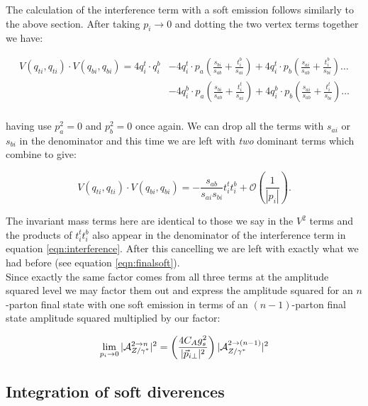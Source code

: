 			The calculation of the interference term with a soft emission follows similarly to the above section.  After taking $p_i\rightarrow0$ and dotting the two vertex terms together we have:

			\begin{equation}
			\begin{split}
			V(q_{ti}, q_{ti})\cdot V(q_{bi}, q_{bi}) = 4q_i^t\cdot q_i^b &- 4q_i^t\cdot p_a\left(\frac{s_{bi}}{s_{ab}} + \frac{t_i^b}{s_{ai}}\right) + 4q_i^t\cdot p_b\left(\frac{s_{ai}}{s_{ab}} + \frac{t_i^b}{s_{bi}}\right) \ldots\\
			&- 4q_i^b\cdot p_a\left(\frac{s_{bi}}{s_{ab}} + \frac{t_i^t}{s_{ai}}\right) + 4q_i^b\cdot p_b\left(\frac{s_{ai}}{s_{ab}} + \frac{t_i^t}{s_{bi}}\right) \ldots\\\end{split}
			\end{equation}

			having use $p_a^2=0$ and $p_b^2=0$ once again.  We can drop all the terms with $s_{ai}$ or $s_{bi}$ in the denominator and this time we are left with \emph{two} dominant terms which combine to give:

			\begin{equation}
			V(q_{ti}, q_{ti})\cdot V(q_{bi}, q_{bi}) = -\frac{s_{ab}}{s_{ai}s_{bi}}t_i^tt_i^b + \mathcal{O}\left(\frac{1}{|p_i|}\right).
			\end{equation}

			The invariant mass terms here are identical to those we say in the $V^2$ terms and the products of $t_i^tt_i^b$ also appear in the denominator of the interference term in equation \ref{eqn:interference}.  After this cancelling we are left with exactly what we had before (see equation \ref{eqn:finalsoft}).\\	Since exactly the same factor comes from all three terms at the amplitude squared level we may factor them out and express the amplitude squared for an $n$-parton final state with one soft emission in terms of an $(n-1)$-parton final state amplitude squared multiplied by our factor:

			\begin{equation}
			\lim_{p_i\rightarrow0} |\mathcal{A}_{Z/\gamma^*}^{2\rightarrow n}|^2 = \left(\frac{4C_Ag_s^2}{|\vec{p}_{i\perp}|^2}\right)|\mathcal{A}_{Z/\gamma^*}^{2\rightarrow (n-1)}|^2
			\end{equation}

		\subsection{Integration of soft diverences}
		\label{sub:subsection_name}


